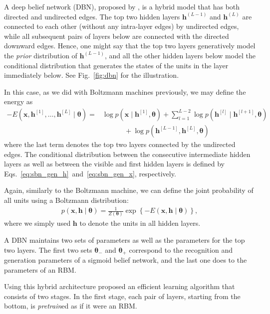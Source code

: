 \documentclass[dissertation,nocontribution,draft*]{aaltoseries}
\newcommand{\qlay}[1]{\left[#1\right]}
\newcommand{\vect}[1]{\mathbf{#1}}
\newcommand{\vects}[1]{\boldsymbol{#1}}
\newcommand{\vh}[0]{\vect{h}}
\newcommand{\vx}[0]{\vect{x}}
\newcommand{\TT}[0]{{\vects{\theta}}}
\begin{document}
A deep belief network (DBN), proposed by
\citet{Hinton2006nc}, is a hybrid model that has both
directed and undirected edges.  The top two hidden layers
$\vh^{(L-1)}$ and $\vh^{(L)}$ are connected to each other 
(without any intra-layer edges) by undirected edges,
while all subsequent pairs of layers below are connected
with the directed downward edges. Hence, one might say that
the top two layers generatively model the \textit{prior}
distribution of $\vh^{(L-1)}$, and all the other hidden layers
below model the conditional distribution that generates the
states of the units in the layer immediately below. See
Fig.~\ref{fig:dbn} for the illustration.

In this case, as we did with Boltzmann machines previously,
we may define the energy as
\begin{align}
    \label{eq:dbn_energy}
    -E(\vx, \vh^{\qlay{1}}, \dots, \vh^{\qlay{L}} \mid \TT)
    = 
    &\log p(\vx \mid \vh^{\qlay{1}}, \TT) + \sum_{l=1}^{L-2} \log
    p(\vh^{\qlay{l}} \mid \vh^{\qlay{l+1}}, \TT) 
    \nonumber \\
    &\phantom{= \log}+\log p(\vh^{\qlay{L-1}}, \vh^{\qlay{L}}, \TT) 
\end{align}
where the last term denotes the top two layers connected by
the undirected edges. The conditional distribution between
the consecutive intermediate hidden layers as well as between
the visible and first hidden layers is defined by
Eqs.~\eqref{eq:sbn_gen_h}~and~\eqref{eq:sbn_gen_x},
respectively.

Again, similarly to the Boltzmann machine, we can define the
joint probability of all units using a Boltzmann
distribution:
\begin{align*}
    p(\vx, \vh \mid \TT) = \frac{1}{Z(\TT)} \exp \left\{
    -E(\vx, \vh \mid \TT)
    \right\},
\end{align*}
where we simply used $\vh$ to denote the units in all hidden
layers.

A DBN maintains two sets of parameters as well as the
parameters for the top two layers.  The first two sets
$\TT_-$ and $\TT_+$ correspond to the recognition and
generation parameters of a sigmoid belief network, and the
last one 
does to the parameters of an RBM.

Using this hybrid architecture \citet{Hinton2006nc} proposed
an efficient learning algorithm that consists of two stages.
In the first stage, each pair of layers, starting from the
bottom, is \textit{pretrain}ed as if it were an RBM.
\end{document}
